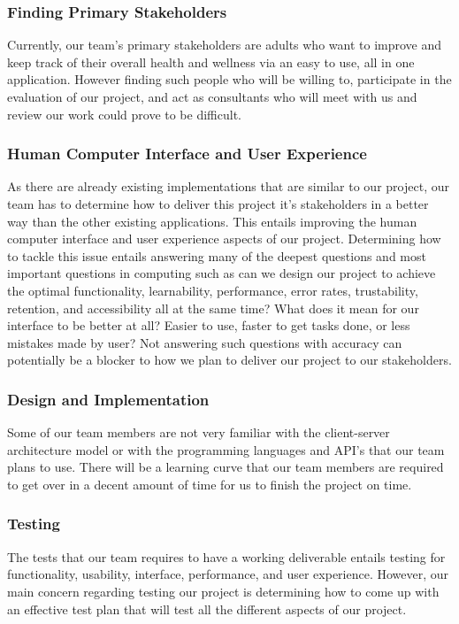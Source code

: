 \documentclass{article}
\begin{document}
\subsubsection{Finding Primary Stakeholders}
Currently, our team's primary stakeholders are adults who want to improve and keep track of their overall health and wellness via an easy to use, all in one application. However finding such people who will be willing to, participate in the evaluation of our project, and act as consultants who will meet with us and review our work could prove to be difficult.

\subsubsection{Human Computer Interface and User Experience}
As there are already existing implementations that are similar to our project, our team has to determine how to deliver this project it's stakeholders in a better way than the other existing applications. This entails improving the human computer interface and user experience aspects of our project. Determining how to tackle this issue entails answering many of the deepest questions and most important questions in computing such as can we design our project to achieve the optimal functionality, learnability, performance, error rates, trustability, retention, and accessibility all at the same time? What does it mean for our interface to be better at all? Easier to use, faster to get tasks done, or less mistakes made by user? Not answering such questions with accuracy can potentially be a blocker to how we plan to deliver our project to our stakeholders.

\subsubsection{Design and Implementation}
Some of our team members are not very familiar with the client-server architecture model or with the programming languages and API's that our team plans to use. There will be a learning curve that our team members are required to get over in a decent amount of time for us to finish the project on time.

\subsubsection{Testing}
The tests that our team requires to have a working deliverable entails testing for functionality, usability, interface, performance, and user experience. However, our main concern regarding testing our project is determining how to come up with an effective test plan that will test all the different aspects of our project.
\end{document}

